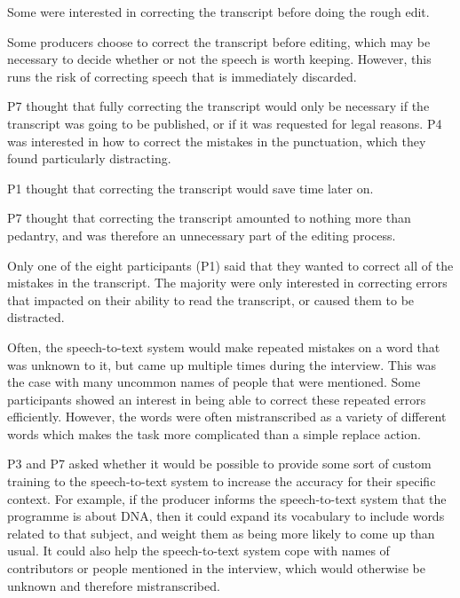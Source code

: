 

Some were interested in correcting the transcript before doing the rough edit.

Some producers choose to correct the transcript before editing, which may be necessary to decide whether or not the
speech is worth keeping. However, this runs the risk of correcting speech that is immediately discarded.

P7 thought that fully correcting the transcript would only be necessary if the transcript was going to be published, or
if it was requested for legal reasons. P4 was interested in how to correct the mistakes in the punctuation, which they
found particularly distracting.

P1 thought that correcting the transcript would save time later on.

P7 thought that correcting the transcript amounted to nothing more than pedantry, and was therefore an unnecessary part
of the editing process.

Only one of the eight participants (P1) said that they wanted to correct all of the mistakes in the transcript. The
majority were only interested in correcting errors that impacted on their ability to read the transcript, or caused
them to be distracted.


Often, the speech-to-text system would make repeated mistakes on a word that was unknown to it,
but came up multiple times during the interview. This was the case with many uncommon names of people that were
mentioned. Some participants showed an interest in being able to correct these repeated errors efficiently. However,
the words were often mistranscribed as a variety of different words which makes the task more complicated than a simple
replace action.


P3 and P7 asked whether it would be possible to provide some sort of custom training to the speech-to-text system to
increase the accuracy for their specific context. For example, if the producer informs the speech-to-text system that
the programme is about DNA, then it could expand its vocabulary to include words related to that subject, and weight
them as being more likely to come up than usual. It could also help the speech-to-text system cope with names of
contributors or people mentioned in the interview, which would otherwise be unknown and therefore mistranscribed.

